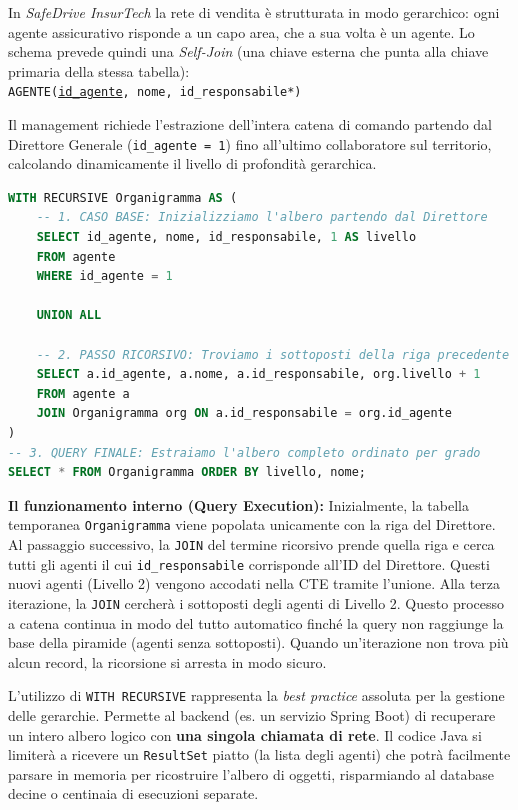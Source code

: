 \begin{example}
In \textit{SafeDrive InsurTech} la rete di vendita è strutturata in modo gerarchico: ogni agente assicurativo risponde a un capo area, che a sua volta è un agente. Lo schema prevede quindi una \textit{Self-Join} (una chiave esterna che punta alla chiave primaria della stessa tabella): \\
\texttt{AGENTE(\underline{id\_agente}, nome, id\_responsabile*)}

Il management richiede l'estrazione dell'intera catena di comando partendo dal Direttore Generale (\texttt{id\_agente = 1}) fino all'ultimo collaboratore sul territorio, calcolando dinamicamente il livello di profondità gerarchica.

\begin{lstlisting}[language=SQL, basicstyle=\ttfamily\small, keywordstyle=\color{blue}\bfseries]
WITH RECURSIVE Organigramma AS (
    -- 1. CASO BASE: Inizializziamo l'albero partendo dal Direttore
    SELECT id_agente, nome, id_responsabile, 1 AS livello
    FROM agente
    WHERE id_agente = 1

    UNION ALL

    -- 2. PASSO RICORSIVO: Troviamo i sottoposti della riga precedente
    SELECT a.id_agente, a.nome, a.id_responsabile, org.livello + 1
    FROM agente a
    JOIN Organigramma org ON a.id_responsabile = org.id_agente
)
-- 3. QUERY FINALE: Estraiamo l'albero completo ordinato per grado
SELECT * FROM Organigramma ORDER BY livello, nome;
\end{lstlisting}

\textbf{Il funzionamento interno (Query Execution):}
Inizialmente, la tabella temporanea \texttt{Organigramma} viene popolata unicamente con la riga del Direttore. Al passaggio successivo, la \texttt{JOIN} del termine ricorsivo prende quella riga e cerca tutti gli agenti il cui \texttt{id\_responsabile} corrisponde all'ID del Direttore. Questi nuovi agenti (Livello 2) vengono accodati nella CTE tramite l'unione. Alla terza iterazione, la \texttt{JOIN} cercherà i sottoposti degli agenti di Livello 2. 
Questo processo a catena continua in modo del tutto automatico finché la query non raggiunge la base della piramide (agenti senza sottoposti). Quando un'iterazione non trova più alcun record, la ricorsione si arresta in modo sicuro.
\end{example}

\begin{bestpractice}
L'utilizzo di \texttt{WITH RECURSIVE} rappresenta la \textit{best practice} assoluta per la gestione delle gerarchie. Permette al backend (es. un servizio Spring Boot) di recuperare un intero albero logico con \textbf{una singola chiamata di rete}. Il codice Java si limiterà a ricevere un \texttt{ResultSet} piatto (la lista degli agenti) che potrà facilmente parsare in memoria per ricostruire l'albero di oggetti, risparmiando al database decine o centinaia di esecuzioni separate.
\end{bestpractice}

